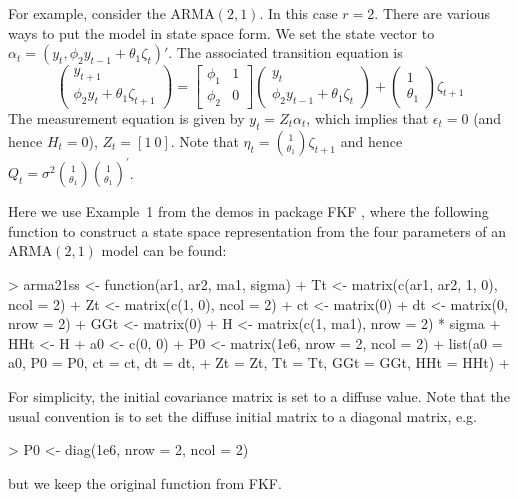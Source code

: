 \documentclass{article}
\begin{document}
For example, consider the $\text{ARMA}(2, 1)$.
In this case $r=2$. There are various ways to put the model in state space form.
We set the state vector to $\alpha_{t} = (y_{t} , \phi_2 y_{t-1} + \theta_1 \zeta_{t})'$.
The associated transition equation is
\begin{equation*}
  \begin{pmatrix}
    y_{t+1}\\
    \phi_2 y_t + \theta_1 \zeta_{t+1}
  \end{pmatrix}
  =
  \begin{bmatrix}
    \phi_1 & 1 \\
    \phi_2 & 0
  \end{bmatrix}
  \begin{pmatrix}
    y_{t}\\
    \phi_2 y_{t-1} + \theta_1 \zeta_{t}
  \end{pmatrix}
  +
  \begin{pmatrix}
    1\\
    \theta_1
  \end{pmatrix}
  \zeta_{t+1}
  \label{eq:Arma21}
\end{equation*}
The measurement equation is given by $y_t = Z_t \alpha_t$, which implies that $\epsilon_t=0 $
(and hence $H_t=0$), $Z_t=[1 \ 0]$.  Note that $ \eta_t = \binom{1}{\theta_1}\zeta_{t+1} $
and hence $ Q_t= \sigma^2 \binom{1}{\theta_1} \binom{1}{\theta_1}^\prime$.

Here we use Example~1 from the demos in package FKF \citep{FKFpackage}, where the following
function to construct a state space representation from the four parameters of an
$\text{ARMA}(2, 1)$ model can be found:
\begin{Schunk}
\begin{Sinput}
> arma21ss <- function(ar1, ar2, ma1, sigma) {
+     Tt <- matrix(c(ar1, ar2, 1, 0), ncol = 2)
+     Zt <- matrix(c(1, 0), ncol = 2)
+     ct <- matrix(0)
+     dt <- matrix(0, nrow = 2)
+     GGt <- matrix(0)
+     H <- matrix(c(1, ma1), nrow = 2) * sigma
+     HHt <- H %
+     a0 <- c(0, 0)
+     P0 <- matrix(1e6, nrow = 2, ncol = 2)
+     list(a0 = a0, P0 = P0, ct = ct, dt = dt,
+          Zt = Zt, Tt = Tt, GGt = GGt, HHt = HHt)
+ }
\end{Sinput}
\end{Schunk}
For simplicity, the initial covariance matrix is set to a diffuse value. Note that the
usual convention is to set the diffuse initial matrix to a diagonal matrix, e.g.
\begin{Schunk}
\begin{Sinput}
> P0 <- diag(1e6, nrow = 2, ncol = 2)
\end{Sinput}
\end{Schunk}
but we keep the original function from FKF.
\end{document}
